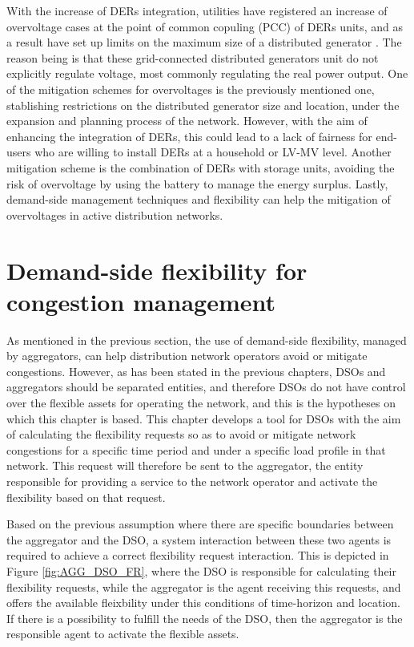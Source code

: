 With the increase of DERs integration, utilities have registered an increase of overvoltage cases at the point of common copuling (PCC) of DERs units, and as a result have set up limits on the maximum size of a distributed generator \cite{Kennedy2014}. The reason being is that these grid-connected distributed generators unit do not explicitly regulate voltage, most commonly regulating the real power output. One of the mitigation schemes for overvoltages is the previously mentioned one, stablishing restrictions on the distributed generator size and location, under the expansion and planning process of the network. However, with the aim of enhancing the integration of DERs, this could lead to a lack of fairness for end-users who are willing to install DERs at a household or LV-MV level. Another mitigation scheme is the combination of DERs with storage units, avoiding the risk of overvoltage by using the battery to manage the energy surplus. Lastly, demand-side management techniques and flexibility can help the mitigation of overvoltages in active distribution networks. 

\section{Demand-side flexibility for congestion management}
As mentioned in the previous section, the use of demand-side flexibility, managed by aggregators, can help distribution network operators avoid or mitigate congestions. However, as has been stated in the previous chapters, DSOs and aggregators should be separated entities, and therefore DSOs do not have control over the flexible assets for operating the network, and this is the hypotheses on which this chapter is based. This chapter develops a tool for DSOs with the aim of calculating the flexibility requests so as to avoid or mitigate network congestions for a specific time period and under a specific load profile in that network. This request will therefore be sent to the aggregator, the entity responsible for providing a service to the network operator and activate the flexibility based on that request. 

Based on the previous assumption where there are specific boundaries between the aggregator and the DSO, a system interaction between these two agents is required to achieve a correct flexibility request interaction. This is depicted in Figure \ref{fig:AGG_DSO_FR}, where the DSO is responsible for calculating their flexibility requests, while the aggregator is the agent receiving this requests, and offers the available fleixbility under this conditions of time-horizon and location. If there is a possibility to fulfill the needs of the DSO, then the aggregator is the responsible agent to activate the flexible assets. 

